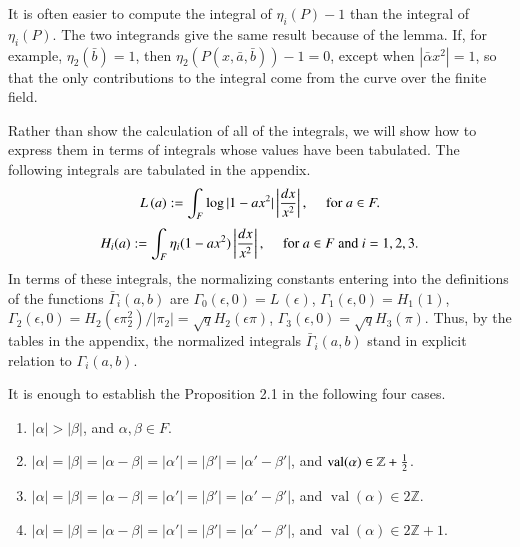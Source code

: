 \documentclass{amsart}
\newcommand\leftd[1]{\left | {d#1\over #1^2}\right |}
\newcommand\leftdx{\leftd x}
\newcommand\LOG{{L\,}}
\newcommand\bGamma{\bar\Gamma}
\newcommand\val{\operatorname{val}}
\newenvironment{cthm}[1]
  {\renewcommand\thethm{\bf #1}\thm}
  {\endthm}
\begin{document}
It is often easier to compute the integral of $\eta_i(P) - 1$ 
than the integral of $\eta_i(P)$.  The two integrands give the
same result because of the lemma.
If, for example, $\eta_2(\bar b) = 1$, then $\eta_2(P(x,\bar a,\bar b))-1=0$,
except when $|\bar\alpha x^2|=1$, so that the only contributions to the
integral come from the curve over the finite field.

Rather than show the calculation of all of the integrals, we will
show how to express them in terms of integrals whose values
have been tabulated.
The following integrals are tabulated in the appendix.
$$\LOG(a) := \int_{F} \log|1-ax^2| \leftdx,
\quad \text{ for } a\in F.$$
$$H_i(a):= \int_{F}\eta_i(1-ax^2) \leftdx,
\quad \text{ for } a\in F \text{ and } i=1,2,3.$$
In terms of these integrals, the normalizing constants
entering into the definitions of the functions $\bGamma_i(a,b)$
are
$\Gamma_0(\epsilon,0) = \LOG(\epsilon)$, $\Gamma_1(\epsilon,0) = H_1(1)$,
$\Gamma_2(\epsilon,0) = H_2(\epsilon \pi_2^2)/|\pi_2| = \sqrt{q}H_2(\epsilon\pi)$,
$\Gamma_3(\epsilon,0) = \sqrt{q} H_3(\pi)$.  
Thus, by the tables in the appendix,
the normalized integrals $\bGamma_i(a,b)$ stand in explicit relation
to $\Gamma_i(a,b)$.

\bigskip
\noindent
\begin{cthm}{Lemma 2.3}  It is enough to establish the Proposition 2.1 
in the following
four cases.  %
\begin{enumerate}[label=(\arabic*)]
\item $|\alpha|>|\beta|$, and $\alpha,\beta\in F$.
\item $|\alpha|=|\beta| = |\alpha-\beta|=|\alpha'|=|\beta'|=|\alpha'-\beta'|$,
and $\val(\alpha)\in {\mathbb Z} + {1\over 2}$.
\item $|\alpha|=|\beta| = |\alpha-\beta|=|\alpha'|=|\beta'|=|\alpha'-\beta'|$,
and $\val(\alpha)\in 2{\mathbb Z}$.
%
\item $|\alpha|=|\beta| = |\alpha-\beta|=|\alpha'|=|\beta'|=|\alpha'-\beta'|$,
and $\val(\alpha)\in 2{\mathbb Z}+1$.
\end{enumerate}
\end{cthm}
\end{document}
